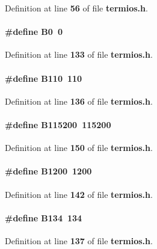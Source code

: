 Definition at line {\bf 56} of file {\bf termios.\+h}.

\paragraph[{B0}]{\setlength{\rightskip}{0pt plus 5cm}\#define B0~0}\label{termios_8h_a8a03ef52aa4926d1d75cb647ac768622}


Definition at line {\bf 133} of file {\bf termios.\+h}.

\paragraph[{B110}]{\setlength{\rightskip}{0pt plus 5cm}\#define B110~110}\label{termios_8h_ac80dbb0a432ec6bcb0eaaf9ff9d6d8e2}


Definition at line {\bf 136} of file {\bf termios.\+h}.

\paragraph[{B115200}]{\setlength{\rightskip}{0pt plus 5cm}\#define B115200~115200}\label{termios_8h_aef3a1340ea0fba1573691a9e74a43d11}


Definition at line {\bf 150} of file {\bf termios.\+h}.

\paragraph[{B1200}]{\setlength{\rightskip}{0pt plus 5cm}\#define B1200~1200}\label{termios_8h_a36fdf3b468aa37c932c5feb0f3a9d7d7}


Definition at line {\bf 142} of file {\bf termios.\+h}.

\paragraph[{B134}]{\setlength{\rightskip}{0pt plus 5cm}\#define B134~134}\label{termios_8h_a7f8ae5839a52e46c4d004ccda5184f43}


Definition at line {\bf 137} of file {\bf termios.\+h}.

